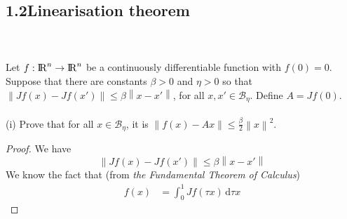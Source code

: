 \documentclass[a4paper,11pt,reqno]{amsart}
\newcommand{\R}{{\rm I\!R}}
\newcommand{\dd}{\mathrm{d}}
\begin{document}
\subsection*{1.2\quad Linearisation theorem}\label{sec:q2}
\
\\ \\
Let $f:\R^n\to\R^n$ be a continuously differentiable function with $f(0)=0$. Suppose that there are constants $\beta>0$ and $\eta>0$ so that $\left\lVert Jf(x)-Jf(x')\right\rVert \leq\beta\left\lVert x-x'\right\rVert $, for all $x, x'\in \mathcal{B}_{\eta}$. Define $A=Jf(0)$.
\\ \\
(i) Prove that for all $x\in \mathcal{B}_{\eta}$, it is $\left\lVert f(x)-Ax\right\rVert \leq \frac{\beta}{2}\left\lVert x\right\rVert ^2$.
\\
\begin{proof}
    We have
\begin{equation}
    \left\lVert Jf(x)-Jf(x')\right\rVert \leq\beta\left\lVert x-x'\right\rVert 
\end{equation}
We know the fact that (from \emph{the Fundamental Theorem of Calculus})
\begin{align}
    f(x)&=\int_{0}^{1}Jf(\tau x)  \,\dd\tau x 

\end{align}
\end{proof}
\end{document}
